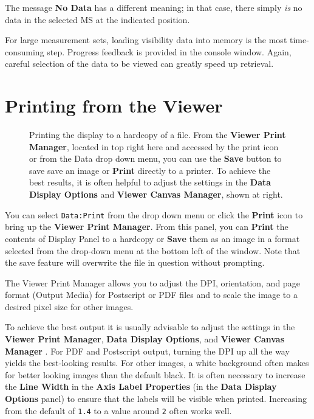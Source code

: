 The message {\bf No Data} has a different meaning; in that
case, there simply {\it is} no data in the selected MS at the
indicated position.

For large measurement sets, loading visibility data into memory is the
most time-consuming step.  Progress feedback is provided in the
console window.  Again, careful selection of the data to be viewed can
greatly speed up retrieval.

\section{Printing from the Viewer}
\label{section:display.print}

\begin{figure}[h!]
\begin{center}
\caption{\label{fig:viewer_print} Printing the display to a hardcopy
of a file. From the {\bf Viewer Print Manager}, located in top right here and
accessed by the print icon or from the Data drop down menu, 
you can use the {\bf Save} button to save save an image or {\bf Print}
directly to a printer. To achieve the best results, it is often helpful to
adjust the settings in the {\bf Data Display Options} and {\bf Viewer Canvas Manager},
shown at right.} 
\hrulefill
\end{center}
\end{figure}

You can select {\tt Data:Print} from the drop down menu or click 
the {\bf Print} icon to bring up the {\bf Viewer Print Manager}. From this 
panel, you can {\bf Print} the contents of Display Panel to a hardcopy
or {\bf Save} them as an image in a format selected from the drop-down
menu at the bottom left of the window. Note that the save feature will
overwrite the file in question without prompting.

The Viewer Print Manager allows you to adjust the DPI, orientation,
and page format (Output Media) for Postscript or PDF files and to
scale the image to a desired pixel size for other images.

To achieve the best output it is usually advisable to adjust the settings
in the {\bf Viewer Print Manager}, {\bf Data Display Options}, 
and {\bf Viewer Canvas Manager} . For PDF and Postscript output, turning
the DPI up all the way yields the best-looking results. For other images,
a white background often makes for better looking images than the 
default black. It is often necessary to increase the {\bf Line Width}
in the {\bf Axis Label Properties} (in the {\bf Data Display Options} panel)
to ensure that the labels will be visible when printed.  Increasing from the default
of {\tt 1.4} to a value around {\tt 2} often works well.

